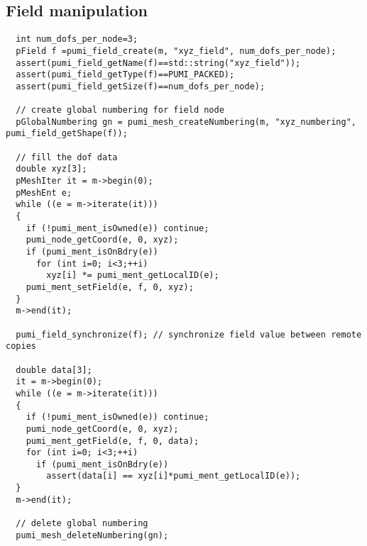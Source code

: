 \subsection{ Field manipulation}
\begin{small}
\begin{verbatim}
  int num_dofs_per_node=3;
  pField f =pumi_field_create(m, "xyz_field", num_dofs_per_node);
  assert(pumi_field_getName(f)==std::string("xyz_field"));
  assert(pumi_field_getType(f)==PUMI_PACKED);
  assert(pumi_field_getSize(f)==num_dofs_per_node);

  // create global numbering for field node
  pGlobalNumbering gn = pumi_mesh_createNumbering(m, "xyz_numbering", pumi_field_getShape(f));

  // fill the dof data
  double xyz[3];
  pMeshIter it = m->begin(0);
  pMeshEnt e;
  while ((e = m->iterate(it)))
  {
    if (!pumi_ment_isOwned(e)) continue;
    pumi_node_getCoord(e, 0, xyz);
    if (pumi_ment_isOnBdry(e)) 
      for (int i=0; i<3;++i) 
        xyz[i] *= pumi_ment_getLocalID(e);
    pumi_ment_setField(e, f, 0, xyz);
  }
  m->end(it);

  pumi_field_synchronize(f); // synchronize field value between remote copies

  double data[3];
  it = m->begin(0);
  while ((e = m->iterate(it)))
  {
    if (!pumi_ment_isOwned(e)) continue;
    pumi_node_getCoord(e, 0, xyz);
    pumi_ment_getField(e, f, 0, data);
    for (int i=0; i<3;++i) 
      if (pumi_ment_isOnBdry(e)) 
        assert(data[i] == xyz[i]*pumi_ment_getLocalID(e));
  }
  m->end(it);

  // delete global numbering
  pumi_mesh_deleteNumbering(gn);

\end{verbatim}
\end{small}
